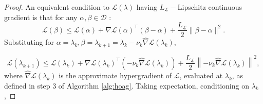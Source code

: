 \documentclass[11pt, twoside]{report}
\begin{document}
\begin{proof}
    An equivalent condition to $\mathcal{L}(\lambda)$ having $L_{\mathcal{L}}-$Lipschitz continuous gradient is that for any $\alpha,\beta \in \mathcal{D}$ \cite{Zhou2018}:
\begin{equation} \label{lipschitz_equiv}
    \mathcal{L}(\beta) \leq \mathcal{L}(\alpha) + \nabla \mathcal{L}(\alpha)^\top (\beta - \alpha) + \frac{L_{\mathcal{L}}}{2}\|\beta - \alpha\|^2.
\end{equation}
Substituting for $\alpha = \lambda_k, \beta = \lambda_{k+1} = \lambda_k - \nu_k\widehat{\nabla}\mathcal{L}(\lambda_k)$,

\[\mathcal{L}(\lambda_{k+1}) \leq \mathcal{L}(\lambda_k) + \nabla \mathcal{L}(\lambda_k)^\top \left(-\nu_k\widehat{\nabla}\mathcal{L}(\lambda_k)\right) + \frac{L_{\mathcal{L}}}{2}\left\|-\nu_k\widehat{\nabla}\mathcal{L}(\lambda_k)\right\|^2,\]
where $\widehat{\nabla} \mathcal{L}(\lambda_k)$ is the approximate hypergradient of $\mathcal{L}$, evaluated at $\lambda_k$, as defined in step 3 of Algorithm \ref{alg:hoag}. Taking expectation, conditioning on $\lambda_k$,


\end{proof}
\end{document}
